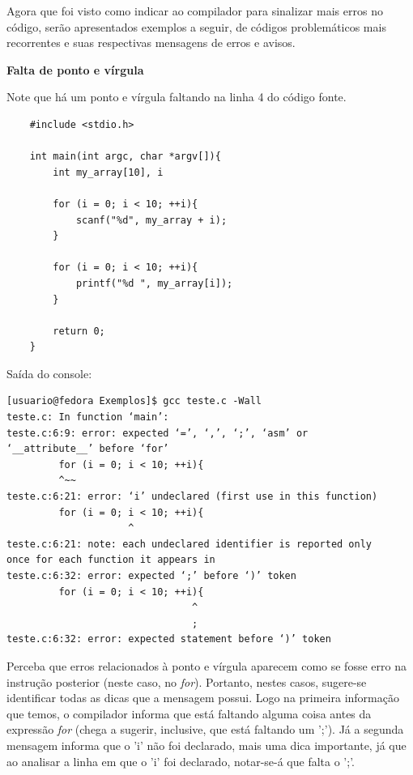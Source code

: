 \documentclass[12pt]{article}
\newcommand\tab[1][1cm]{\hspace*{#1}}
\begin{document}
\par\tab Agora que foi visto como indicar ao compilador para sinalizar mais erros no código, serão apresentados exemplos a seguir, de códigos problemáticos mais recorrentes e suas respectivas mensagens de erros e avisos.

\par\tab\textbf{Falta de ponto e vírgula}
\par\tab Note que há um ponto e vírgula faltando na linha 4 do código fonte.

\hspace{0.25cm}
\begin{lstlisting}
    #include <stdio.h>
    
    int main(int argc, char *argv[]){
        int my_array[10], i
        
        for (i = 0; i < 10; ++i){
            scanf("%d", my_array + i);
        }
        
        for (i = 0; i < 10; ++i){
            printf("%d ", my_array[i]);
        }
        
        return 0;
    }
\end{lstlisting}

\par\tab Saída do console:

\hspace{0.25cm}
\begin{tcolorbox}[colback=black!5!white,colframe=black!75!white,title=Console: usuario@fedora:\~/Exemplos]
    \begin{verbatim}
[usuario@fedora Exemplos]$ gcc teste.c -Wall
teste.c: In function ‘main’:
teste.c:6:9: error: expected ‘=’, ‘,’, ‘;’, ‘asm’ or
‘__attribute__’ before ‘for’
         for (i = 0; i < 10; ++i){
         ^~~
teste.c:6:21: error: ‘i’ undeclared (first use in this function)
         for (i = 0; i < 10; ++i){
                     ^
teste.c:6:21: note: each undeclared identifier is reported only
once for each function it appears in
teste.c:6:32: error: expected ‘;’ before ‘)’ token
         for (i = 0; i < 10; ++i){
                                ^
                                ;
teste.c:6:32: error: expected statement before ‘)’ token
    \end{verbatim}
\end{tcolorbox}

\par\tab Perceba que erros relacionados à ponto e vírgula aparecem como se fosse erro na instrução posterior (neste caso, no \textit{for}). Portanto, nestes casos, sugere-se identificar todas as dicas que a mensagem possui. Logo na primeira informação que temos, o compilador informa que está faltando alguma coisa antes da expressão \textit{for} (chega a sugerir, inclusive, que está faltando um ';'). Já a segunda mensagem informa que o 'i' não foi declarado, mais uma dica importante, já que ao analisar a linha em que o 'i' foi declarado, notar-se-á que falta o ';'.
\end{document}
